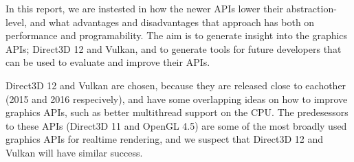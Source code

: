 In this report, we are instested in how the newer \glspl{API} lower their abstraction-level, and what advantages and disadvantages that approach has both on performance and programability.
The aim is to generate insight into the graphics \glspl{API}; Direct3D 12 and Vulkan, and to generate tools for future developers that can be used to evaluate and improve their \glspl{API}.

Direct3D 12 and Vulkan are chosen, because they are released close to eachother (2015 and 2016 respecively), and have some overlapping ideas on how to improve graphics \glspl{API}, such as better multithread support on the CPU.
The predesessors to these \glspl{API} (Direct3D 11 and OpenGL 4.5) are some of the most broadly used graphics \glspl{API} for realtime rendering, and we suspect that Direct3D 12 and Vulkan will have similar success.





